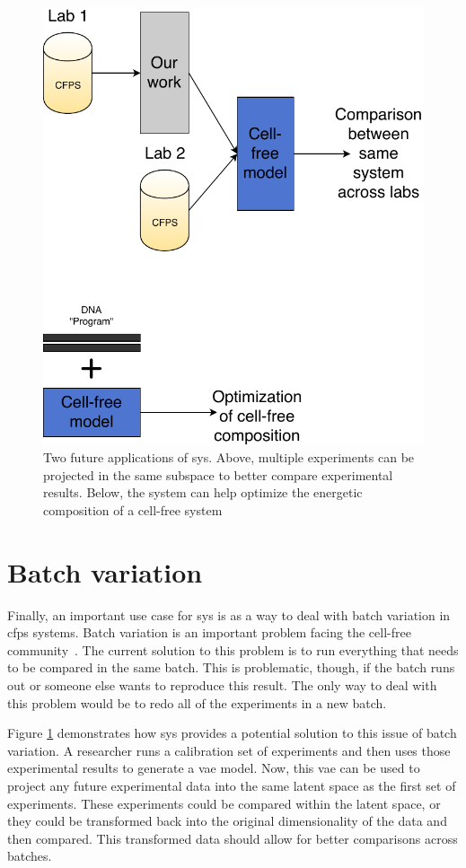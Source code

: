 \begin{figure}[t!]
\begin{center}
\includegraphics{figs/Applications.pdf}
\caption[Future applications of \gls{sys}]
{Two future applications of \gls{sys}.
Above, multiple experiments can be projected in the same subspace to better compare experimental results.
Below, the system can help optimize the energetic composition of a cell-free system}
\end{center}
\label{fig:apps}
\end{figure}

\section{Batch variation}
Finally, an important use case for \gls{sys} is as a way to deal with batch variation in \gls{cfps} systems.
Batch variation is an important problem facing the cell-free community~\cite{sun2013protocols, chizzolini2017cell}.
The current solution to this problem is to run everything that needs to be compared in the same batch.
This is problematic, though, if the batch runs out or someone else wants to reproduce this result.
The only way to deal with this problem would be to redo all of the experiments in a new batch.

Figure \ref{fig:apps} demonstrates how \gls{sys} provides a potential solution to this issue of batch variation.
A researcher runs a calibration set of experiments and then uses those experimental results to generate a \gls{vae} model.
Now, this \gls{vae} can be used to project any future experimental data into the same latent space as the first set of experiments.
These experiments could be compared within the latent space, or they could be transformed back into the original dimensionality of the data and then compared.
This transformed data should allow for better comparisons across batches.